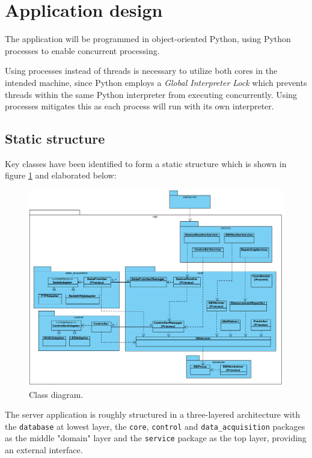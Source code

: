 \newpage
\section{Application design}
The application will be programmed in object-oriented Python, using Python processes to enable concurrent processing. 

Using processes instead of threads is necessary to utilize both cores in the intended machine, since Python employs a \emph{Global Interpreter Lock} which prevents threads within the same Python interpreter from executing concurrently. Using processes mitigates this as each process will run with its own interpreter. 

\subsection{Static structure}
Key classes have been identified to form a static structure which is shown in figure \ref{figureClassDiagram} and elaborated below:

\begin{figure}[H]
    \centering
    \includegraphics[width=\textwidth]{figures/class_diagram}
    \caption{Class diagram. }
    \label{figureClassDiagram}
\end{figure}

The server application is roughly structured in a three-layered architecture with the \texttt{database} at lowest layer, the \texttt{core}, \texttt{control} and \texttt{data\_acquisition} packages as the middle "domain" layer and the \texttt{service} package as the top layer, providing an external interface. 

